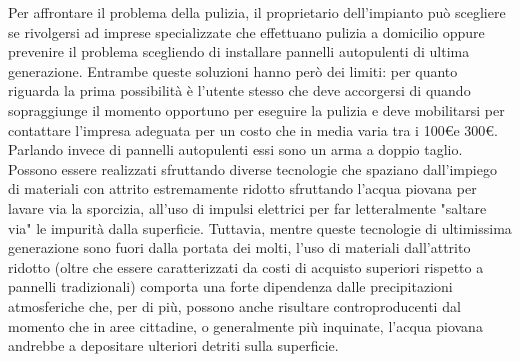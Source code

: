 \documentclass[a4paper, 12pt]{article}
\begin{document}
	Per affrontare il problema della pulizia, il proprietario dell'impianto può scegliere se rivolgersi ad imprese specializzate che effettuano pulizia a domicilio oppure prevenire il problema scegliendo di installare pannelli autopulenti di ultima generazione. Entrambe queste soluzioni hanno però dei limiti: per quanto riguarda la prima possibilità è l'utente stesso che deve accorgersi di quando sopraggiunge il momento opportuno per eseguire la pulizia e deve mobilitarsi per contattare l'impresa adeguata per un costo che in media varia tra i 100\euro e 300\euro.\\
	Parlando invece di pannelli autopulenti essi sono un arma a doppio taglio.\\
	Possono essere realizzati sfruttando diverse tecnologie che spaziano dall'impiego di materiali con attrito estremamente ridotto sfruttando l'acqua piovana per lavare via la sporcizia, all'uso di impulsi elettrici per far letteralmente "saltare via" le impurità dalla superficie. Tuttavia, mentre queste tecnologie di ultimissima generazione sono fuori dalla portata dei molti, l'uso di materiali dall'attrito ridotto (oltre che essere caratterizzati da costi di acquisto superiori rispetto  a pannelli tradizionali) comporta una forte dipendenza dalle precipitazioni atmosferiche che, per di più, possono anche risultare controproducenti dal momento che in aree cittadine, o generalmente più inquinate, l'acqua piovana andrebbe a depositare ulteriori detriti sulla superficie.\\
\end{document}
